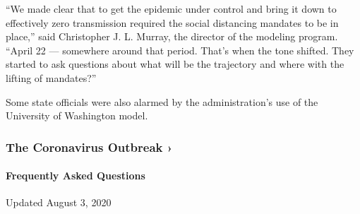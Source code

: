 ``We made clear that to get the epidemic under control and bring it down
to effectively zero transmission required the social distancing mandates
to be in place,'' said Christopher J. L. Murray, the director of the
modeling program. ``April 22 --- somewhere around that period. That's
when the tone shifted. They started to ask questions about what will be
the trajectory and where with the lifting of mandates?''

Some state officials were also alarmed by the administration's use of
the University of Washington model.

\href{https://www.nytimes.com/news-event/coronavirus?action=click\&pgtype=Article\&state=default\&region=MAIN_CONTENT_3\&context=storylines_faq}{}

\hypertarget{the-coronavirus-outbreak-}{%
\subsubsection{The Coronavirus Outbreak
›}\label{the-coronavirus-outbreak-}}

\hypertarget{frequently-asked-questions}{%
\paragraph{Frequently Asked
Questions}\label{frequently-asked-questions}}

Updated August 3, 2020

